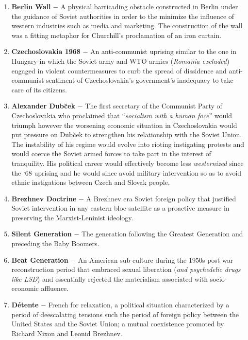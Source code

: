 \documentclass[12pt]{article}
\begin{document}
\begin{flushleft}
\begin{enumerate}
    \item \textbf{Berlin Wall} $-$ A physical barricading obstacle constructed in Berlin under the guidance of Soviet authorities in order to the minimize the influence of western industries such as media and marketing. The construction of the wall was a fitting metaphor for Churchill's proclamation of an iron curtain.

    \item \textbf{Czechoslovakia 1968} $-$ An anti-communist uprising similar to the one in Hungary in which the Soviet army and WTO armies (\emph{Romania excluded}) engaged in violent countermeasures to curb the spread of dissidence and anti-communist sentiment of Czechoslovakia's government's inadequacy to take care of its citizens.

    \item \textbf{Alexander Dub\u cek} $-$ The first secretary of the Communist Party of Czechoslovakia who proclaimed that ``\emph{socialism with a human face}'' would triumph however the worsening economic situation in Czechoslovakia would put pressure on Dub\u cek to strengthen his relationship with the Soviet Union. The instability of his regime would evolve into rioting instigating protests and would coerce the Soviet armed forces to take part in the interest of tranquility. His political career would effectively become less \emph{westernized} since the `68 uprising and he would since avoid military intervention so as to avoid ethnic instigations between Czech and Slovak people.

    \item \textbf{Brezhnev Doctrine} $-$ A Brezhnev era Soviet foreign policy that justified Soviet intervention in any eastern bloc satellite as a proactive measure in preserving the Marxist-Leninist ideology.

    \item \textbf{Silent Generation} $-$ The generation following the Greatest Generation and preceding the Baby Boomers.

    \item \textbf{Beat Generation} $-$ An American sub-culture during the 1950s post war reconstruction period that embraced sexual liberation (\emph{and psychedelic drugs like LSD}) and essentially rejected the materialism associated with socio-economic affluence. 

    \item \textbf{D\'etente} $-$ French for relaxation, a political situation characterized by a period of deescalating tensions such the period of foreign policy between the United States and the Soviet Union; a mutual coexistence promoted by Richard Nixon and Leonid Brezhnev.


\end{enumerate}
\end{flushleft}
\end{document}
